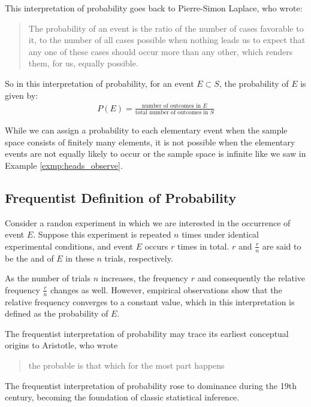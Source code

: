 This interpretation of probability goes back to Pierre-Simon Laplace, who wrote:
\begin{quote}
	The probability of an event is the ratio of the number of cases favorable to it, to the number of all cases possible when nothing leads us to expect that any one of these cases should occur more than any other, which renders them, for us, equally possible.
\end{quote}
So in this interpretation of probability, for an event \( E \subset S \), the probability of \( E \) is given by:
\begin{align*}
	P(E) = \frac{\text{number of outcomes in }E}{\text{total number of outcomes in }S}
\end{align*}

While we can assign a probability to each elementary event when the sample space consists of finitely many elements,
it is not possible when the elementary events are not equally likely to occur or the sample space is infinite like we saw in Example \autoref{exmp:heads_observe}.

\subsection{Frequentist Definition of Probability}

Consider a randon experiment in which we are interested in the occurrence of event \( E \).
Suppose this experiment is repeated \( n \) times under identical experimental conditions,
and event \( E \) occurs \( r \) times in total.
\( r \) and \( \frac{r}{n} \) are said to be the  and  of \( E \) in these
\( n \) trials, respectively.

As the number of trials \( n \) increases, the frequency \( r \) and consequently the relative frequency \( \frac{r}{n} \) changes as well.
However, empirical observations show that the relative frequency converges to a constant value, which in this interpretation is defined as the probability of \( E \).



The frequentist interpretation of probability may trace its earliest conceptual origins to Aristotle, who wrote
\begin{quote}
	the probable is that which for the most part happens
\end{quote}
The frequentist interpretation of probability rose to dominance during the 19th century, becoming the foundation of classic statistical inference.

